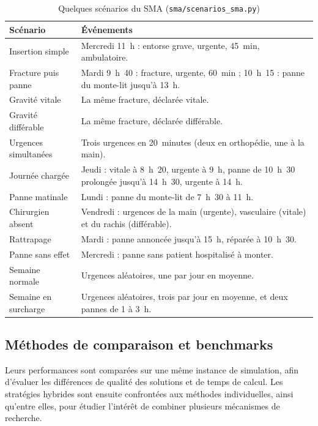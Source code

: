 \documentclass[11pt,a4paper]{article}
\begin{document}
\begin{table}[htbp]
\centering
\footnotesize
\caption{Quelques scénarios du SMA (\texttt{sma/scenarios\_sma.py})}
\label{tab:scenarios}
\begin{tabularx}{\linewidth}{@{}p{3.3cm}X@{}}
\toprule
\textbf{Scénario} & \textbf{Événements} \\
\midrule
Insertion simple & Mercredi 11~h : entorse grave, urgente, 45~min, ambulatoire. \\
Fracture puis panne & Mardi 9~h~40 : fracture, urgente, 60~min ; 10~h~15 : panne du monte-lit jusqu'à 13~h. \\
Gravité vitale & La même fracture, déclarée vitale. \\
Gravité différable & La même fracture, déclarée différable. \\
Urgences simultanées & Trois urgences en 20~minutes (deux en orthopédie, une à la main). \\
Journée chargée & Jeudi : vitale à 8~h~20, urgente à 9~h, panne de 10~h~30 prolongée jusqu'à 14~h~30, urgente à 14~h. \\
Panne matinale & Lundi : panne du monte-lit de 7~h~30 à 11~h. \\
Chirurgien absent & Vendredi : urgences de la main (urgente), vasculaire (vitale) et du rachis (différable). \\
Rattrapage & Mardi : panne annoncée jusqu'à 15~h, réparée à 10~h~30. \\
Panne sans effet & Mercredi : panne sans patient hospitalisé à monter. \\
Semaine normale & Urgences aléatoires, une par jour en moyenne. \\
Semaine en surcharge & Urgences aléatoires, trois par jour en moyenne, et deux pannes de 1 à 3~h. \\
\bottomrule
\end{tabularx}
\end{table}

\subsection{Méthodes de comparaison et benchmarks}

Leurs performances sont comparées sur une même instance de simulation, afin d'évaluer les différences de qualité des solutions et de temps de calcul. Les stratégies hybrides sont ensuite confrontées aux méthodes individuelles, ainsi qu'entre elles, pour étudier l'intérêt de combiner plusieurs mécanismes de recherche.
\end{document}
